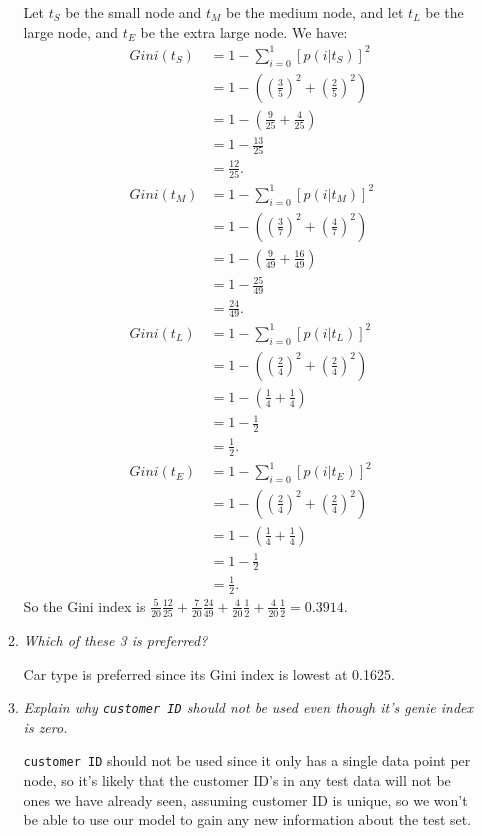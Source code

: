 \documentclass[12pt,oneside,reqno]{amsart}
\theoremstyle{plain}
\theoremstyle{definition}
\theoremstyle{remark}
\newcommand{\bee}{\begin{equation}\begin{aligned}}
\newcommand{\eee}{\end{aligned}\end{equation}}
\newcommand{\fracc}{\frac}
\newcommand{\lpar}{\left(}
\newcommand{\rpar}{\right)}
\newcommand{\inlinecode}{\texttt}
\begin{document}
\begin{enumerate}[label=\arabic*.]
\begin{enumerate}
Let $t_S$ be the small node and $t_M$ be the medium node, and let $t_L$ be the large node, and $t_E$ be the extra large node. We have:
\bee
Gini(t_S) &= 1 - \sum_{i = 0}^1[p(i|t_S)]^2\\
&= 1 - \lpar \lpar \fracc{3}{5} \rpar ^2 + \lpar \fracc{2}{5} \rpar^2 \rpar\\
&= 1 - \lpar \fracc{9}{25} + \fracc{4}{25} \rpar\\ 
&= 1 - \fracc{13}{25} \\
&= \fracc{12}{25}. \\
Gini(t_M) &= 1 - \sum_{i = 0}^1[p(i|t_M)]^2\\
&= 1 - \lpar \lpar \fracc{3}{7} \rpar ^2 + \lpar \fracc{4}{7} \rpar^2 \rpar\\
&= 1 - \lpar \fracc{9}{49} + \fracc{16}{49} \rpar \\
&= 1 - \fracc{25}{49}\\
&= \fracc{24}{49}. \\
Gini(t_L) &= 1 - \sum_{i = 0}^1[p(i|t_L)]^2\\
&= 1 - \lpar \lpar \fracc{2}{4} \rpar ^2 + \lpar \fracc{2}{4} \rpar^2 \rpar\\
&= 1 - \lpar \fracc{1}{4} + \fracc{1}{4} \rpar \\
&= 1 - \fracc{1}{2}\\
&= \fracc{1}{2}. \\
Gini(t_E) &= 1 - \sum_{i = 0}^1[p(i|t_E)]^2\\
&= 1 - \lpar \lpar \fracc{2}{4} \rpar ^2 + \lpar \fracc{2}{4} \rpar^2 \rpar\\
&= 1 - \lpar \fracc{1}{4} + \fracc{1}{4} \rpar \\
&= 1 - \fracc{1}{2}\\
&= \fracc{1}{2}. 
\eee
So the Gini index is $\fracc{5}{20}\fracc{12}{25}+ \fracc{7}{20}\fracc{24}{49} + \fracc{4}{20}\fracc{1}{2} + \fracc{4}{20}\fracc{1}{2}= 0.3914$. 

\item \textit{Which of these 3 is preferred?}

Car type is preferred since its Gini index is lowest at 0.1625.

\item \textit{Explain why \inlinecode{customer ID} should not be used even though it's genie index is zero. }

\inlinecode{customer ID} should not be used since it only has a single data point per node, so it's likely that the customer ID's in any test data will not be ones we have already seen, assuming customer ID is unique, so we won't be able to use our model to gain any new information about the test set. 



\end{enumerate}
\end{enumerate}
\end{document}
